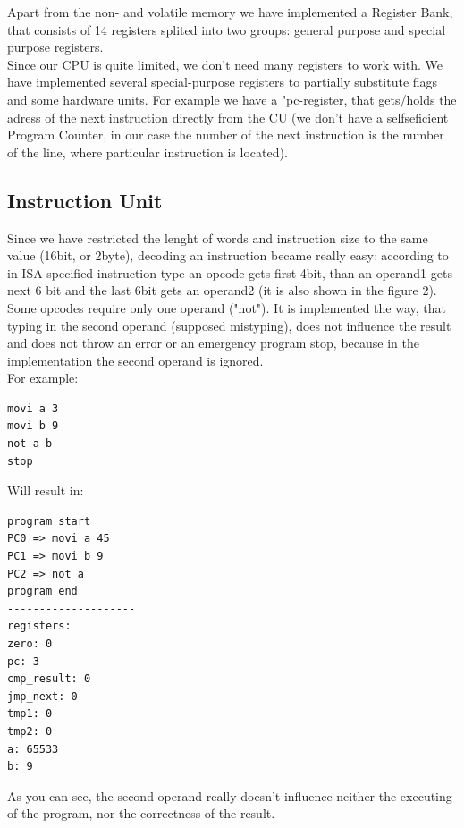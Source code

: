 \documentclass[11pt,a4paper]{article}
\begin{document}
Apart from the non- and volatile memory we have implemented a Register Bank, that consists of 14 registers splited into two groups: general purpose and special purpose registers.\\
Since our CPU is quite limited, we don't need many registers to work with. We have implemented several special-purpose registers to partially substitute flags and some hardware units. For example we have a "pc-register, that gets/holds the adress of the next instruction directly from the CU (we don't have a selfseficient Program Counter, in our case the number of the next instruction is the number of the line, where particular instruction is located).\\

\subsection{Instruction Unit}
Since we have restricted the lenght of words and instruction size to the same value (16bit, or 2byte), decoding an instruction became really easy:
according to in ISA specified instruction type an opcode gets first 4bit, than an operand1 gets next 6 bit and the last 6bit gets an operand2 (it is also shown in the figure 2). Some opcodes require only one operand ("not"). It is implemented the way, that typing in the second operand (supposed mistyping), does not influence the result and does not throw an error or an emergency program stop, because in the implementation the second operand is ignored.\\
For example:
\newpage
\begin{verbatim}
movi a 3
movi b 9
not a b
stop
\end{verbatim}
Will result in:
\begin{verbatim}
program start
PC0 => movi a 45
PC1 => movi b 9
PC2 => not a
program end
--------------------
registers:
zero: 0
pc: 3
cmp_result: 0
jmp_next: 0
tmp1: 0
tmp2: 0
a: 65533
b: 9
\end{verbatim}
As you can see, the second operand really doesn't influence neither the executing of the program, nor the correctness of the result.\\

\newpage
\end{document}

